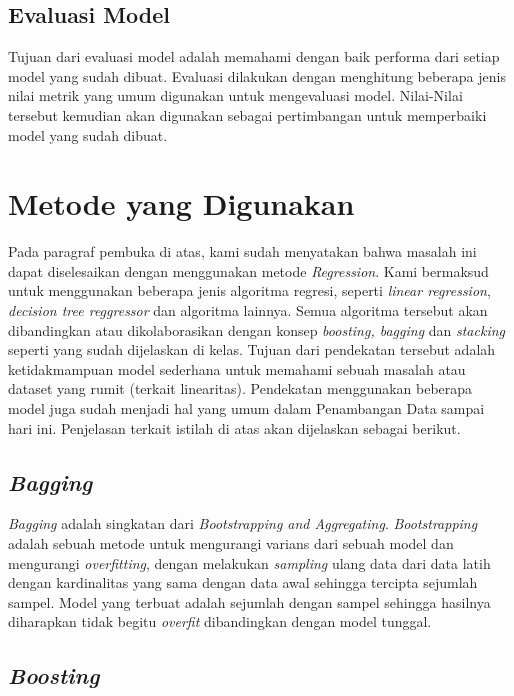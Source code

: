 \documentclass{article}
\begin{document}
\begin{normalsize}
        \subsection{Evaluasi Model}
        Tujuan dari evaluasi model adalah memahami dengan baik performa dari setiap model yang sudah dibuat.
        Evaluasi dilakukan dengan menghitung beberapa jenis nilai metrik yang umum digunakan untuk mengevaluasi
        model. Nilai-Nilai tersebut kemudian akan digunakan sebagai pertimbangan untuk memperbaiki model yang
        sudah dibuat.

        \section{Metode yang Digunakan}

        Pada paragraf pembuka di atas, kami sudah menyatakan bahwa masalah ini dapat diselesaikan dengan menggunakan
        metode \textit{Regression}. Kami bermaksud untuk menggunakan beberapa jenis algoritma regresi, seperti
        \textit{linear regression}, \textit{decision tree reggressor} dan algoritma lainnya. Semua algoritma 
        tersebut akan dibandingkan atau dikolaborasikan dengan konsep \textit{boosting, bagging} dan 
        \textit{stacking} seperti yang sudah dijelaskan di kelas. Tujuan dari pendekatan tersebut adalah ketidakmampuan
        model sederhana untuk memahami sebuah masalah atau dataset yang rumit (terkait linearitas). Pendekatan 
        menggunakan beberapa model juga sudah menjadi hal yang umum dalam Penambangan Data sampai hari ini.
        Penjelasan terkait istilah di atas akan dijelaskan sebagai berikut.

        \subsection{\textit{Bagging}}

        \textit{Bagging} adalah singkatan dari \textit{Bootstrapping and Aggregating}. \textit{Bootstrapping} adalah 
        sebuah metode untuk mengurangi varians dari sebuah model dan mengurangi \textit{overfitting}, dengan melakukan
        \textit{sampling} ulang data dari data latih dengan kardinalitas yang sama dengan data awal sehingga tercipta
        sejumlah sampel. Model yang terbuat adalah sejumlah dengan sampel sehingga hasilnya diharapkan tidak begitu 
        \textit{overfit} dibandingkan dengan model tunggal.

        \subsection{\textit{Boosting}}


\end{normalsize}
\end{document}
